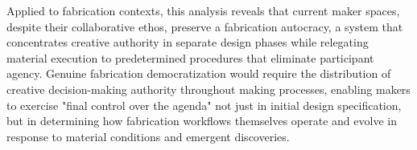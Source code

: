 \vspace{0.5cm}

Applied to fabrication contexts, this analysis reveals that current maker spaces, despite their collaborative ethos, preserve a fabrication autocracy, a system that concentrates creative authority in separate design phases while relegating material execution to predetermined procedures that eliminate participant agency. Genuine fabrication democratization would require the distribution of creative decision-making authority throughout making processes, enabling makers to exercise "final control over the agenda" not just in initial design specification, but in determining how fabrication workflows themselves operate and evolve in response to material conditions and emergent discoveries.